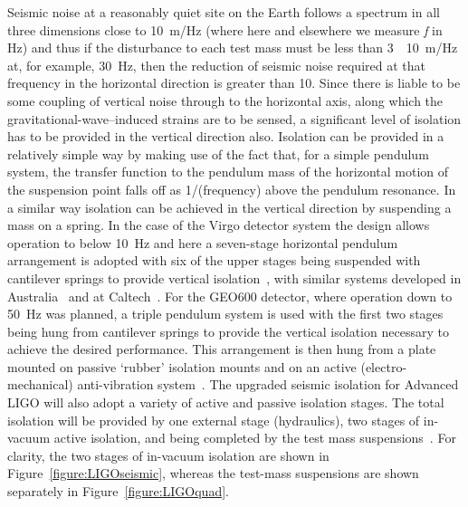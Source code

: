 Seismic noise at a reasonably quiet site on the Earth follows a
spectrum in all three dimensions close to 10~m/Hz (where here and elsewhere we measure
\textit{f} in Hz) and thus if the disturbance to each test mass must
be less than 3~\texttimes~10~m/Hz at, for
example, 30~Hz, then the reduction of seismic noise required at that
frequency in the horizontal direction is greater than
10. Since there is liable to be some coupling of vertical
noise through to the horizontal axis, along which the gravitational-wave--induced strains are to be sensed, a significant level of
isolation has to be provided in the vertical direction also. Isolation
can be provided in a relatively simple way by making use of the fact
that, for a simple pendulum system, the transfer function to the
pendulum mass of the horizontal motion of the suspension point falls
off as 1/(frequency) above the pendulum resonance. In a
similar way isolation can be achieved in the vertical direction by
suspending a mass on a spring. In the case of the Virgo detector
system the design allows operation to below 10~Hz and here a
seven-stage horizontal pendulum arrangement is adopted with six of the
upper stages being suspended with cantilever springs to provide vertical
isolation~\cite{Braccini}, with similar systems developed in
Australia~\cite{Ju1} and at Caltech~\cite{DeSalvo}. For the GEO600
detector, where operation down to 50~Hz was planned, a triple pendulum
system is used with the first two stages being hung from cantilever
springs to provide the vertical isolation necessary to achieve the
desired performance. This arrangement is then hung from a plate
mounted on passive `rubber' isolation mounts and on an active
(electro-mechanical) anti-vibration system~\cite{Plissi1, Torrie}. The
upgraded seismic isolation for Advanced LIGO will also adopt a
variety of active and passive isolation stages. The total isolation
will be provided by one external stage (hydraulics), two stages of
in-vacuum active isolation, and being completed by the test mass
suspensions~\cite{Abbott:2002, Harry:2010}. For clarity, the two
stages of in-vacuum isolation are shown in
Figure~\ref{figure:LIGOseismic}, whereas the test-mass suspensions are
shown separately in Figure~\ref{figure:LIGOquad}.
